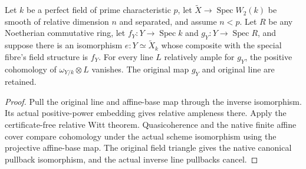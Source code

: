 \begin{theorem}
\label{thm:kn-relative-kodaira-original-witt-comparison}
\leanok
Let $k$ be a perfect field of prime characteristic $p$, let
$\widetilde X\to\operatorname{Spec}W_2(k)$ be smooth of relative dimension $n$
and separated, and assume $n<p$. Let $R$ be any Noetherian commutative ring,
let $f_Y:Y\to\operatorname{Spec}k$ and $g_Y:Y\to\operatorname{Spec}R$, and suppose
there is an isomorphism $e:Y\simeq\widetilde X_k$ whose composite with the
special fibre's field structure is $f_Y$. For every line $L$ relatively ample
for $g_Y$, the positive cohomology of $\omega_{Y/k}\otimes L$ vanishes.
The original map $g_Y$ and original line are retained.
\end{theorem}
\begin{proof}
Pull the original line and affine-base map through the inverse isomorphism.
Its actual positive-power embedding gives relative ampleness there. Apply the
certificate-free relative Witt theorem. Quasicoherence and the native finite
affine cover compare cohomology under the actual scheme isomorphism using the
projective affine-base map. The original field triangle gives the native
canonical pullback isomorphism, and the actual inverse line pullbacks cancel.
\end{proof}

